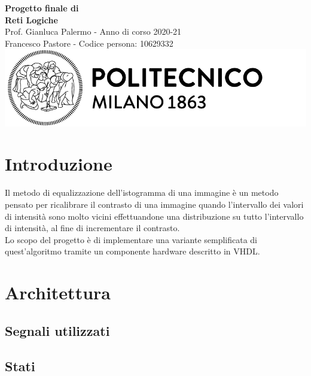 \documentclass{article}
\begin{document}
\begin{titlepage}
    \centering
    \vspace*{\fill}
    \Huge\textbf{Progetto finale di \\ Reti Logiche}\\
    \vspace{5mm} %
    \Large Prof. Gianluca Palermo - Anno di corso 2020-21\\
    \vspace{5mm} %
    \large Francesco Pastore - Codice persona: 10629332\\
    \vspace{100mm}
    \includegraphics[scale=0.7]{logo.png}
    \vspace*{\fill}
\end{titlepage}

\tableofcontents
\pagebreak

\section{Introduzione}
\noindent
Il metodo di equalizzazione dell’istogramma di una immagine è un metodo pensato per ricalibrare il contrasto di una immagine quando l’intervallo dei valori di intensità sono molto vicini effettuandone una distribuzione su tutto l’intervallo di intensità, al fine di incrementare il contrasto. \\
Lo scopo del progetto è di implementare una variante semplificata di quest'algoritmo tramite un componente hardware descritto in VHDL.

\section{Architettura}

\subsection{Segnali utilizzati}
\pagebreak
\subsection{Stati}
\end{document}
